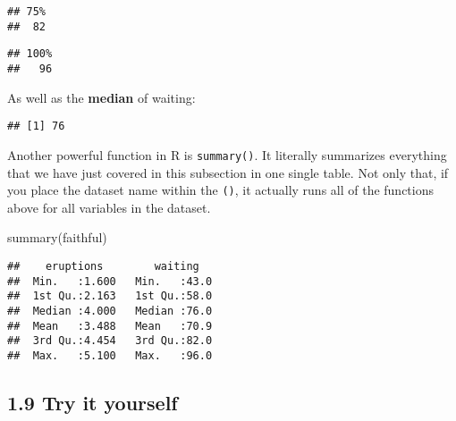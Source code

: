 \documentclass[
]{book}
\newenvironment{Shaded}{\begin{snugshade}}{\end{snugshade}}
\newcommand{\DecValTok}[1]{\textcolor[rgb]{0.00,0.00,0.81}{#1}}
\newcommand{\FunctionTok}[1]{\textcolor[rgb]{0.00,0.00,0.00}{#1}}
\newcommand{\NormalTok}[1]{#1}
\newcommand{\SpecialCharTok}[1]{\textcolor[rgb]{0.00,0.00,0.00}{#1}}
\begin{document}
\begin{verbatim}
## 75% 
##  82
\end{verbatim}

\begin{Shaded}
\end{Shaded}

\begin{verbatim}
## 100% 
##   96
\end{verbatim}

As well as the \textbf{median} of waiting:

\begin{Shaded}
\end{Shaded}

\begin{verbatim}
## [1] 76
\end{verbatim}

Another powerful function in R is \texttt{summary()}. It literally summarizes everything that we have just covered in this subsection in one single table. Not only that, if you place the dataset name within the \texttt{()}, it actually runs all of the functions above for all variables in the dataset.

\begin{Shaded}
\begin{Highlighting}[]
\FunctionTok{summary}\NormalTok{(faithful)}
\end{Highlighting}
\end{Shaded}

\begin{verbatim}
##    eruptions        waiting    
##  Min.   :1.600   Min.   :43.0  
##  1st Qu.:2.163   1st Qu.:58.0  
##  Median :4.000   Median :76.0  
##  Mean   :3.488   Mean   :70.9  
##  3rd Qu.:4.454   3rd Qu.:82.0  
##  Max.   :5.100   Max.   :96.0
\end{verbatim}

\hypertarget{try-it-yourself-8}{%
\subsection{1.9 Try it yourself}\label{try-it-yourself-8}}
\end{document}
